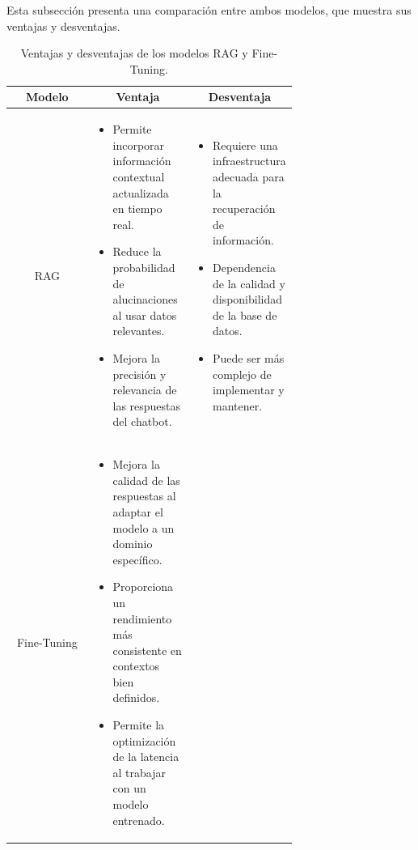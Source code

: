   Esta subsección presenta una comparación entre ambos modelos, que muestra sus ventajas y desventajas.
  \begin{table}[ht]
    \centering
    \caption{Ventajas y desventajas de los modelos RAG y Fine-Tuning.}
    \begin{tabular}{|c|p{0.35\linewidth}|p{0.35\linewidth}|}
        \hline
        \multicolumn{1}{|c|}{\textbf{Modelo}} & \multicolumn{1}{c|}{\textbf{Ventaja}} & \multicolumn{1}{c|}{\textbf{Desventaja}} \\ 
        \hline
        RAG & 
        \begin{raggedright}
        \begin{itemize}
            \item Permite incorporar información contextual actualizada en tiempo real.
            \item Reduce la probabilidad de alucinaciones al usar datos relevantes.
            \item Mejora la precisión y relevancia de las respuestas del chatbot.
        \end{itemize} 
        \end{raggedright} & 
        \begin{raggedright}
        \begin{itemize}
            \item Requiere una infraestructura adecuada para la recuperación de información.
            \item Dependencia de la calidad y disponibilidad de la base de datos.
            \item Puede ser más complejo de implementar y mantener.
        \end{itemize} 
        \end{raggedright} \\
        \hline
        Fine-Tuning & 
        \begin{raggedright}
        \begin{itemize}
            \item Mejora la calidad de las respuestas al adaptar el modelo a un dominio específico.
            \item Proporciona un rendimiento más consistente en contextos bien definidos.
            \item Permite la optimización de la latencia al trabajar con un modelo entrenado.
        \end{itemize} 

\end{raggedright}
\end{tabular}
\end{table}
